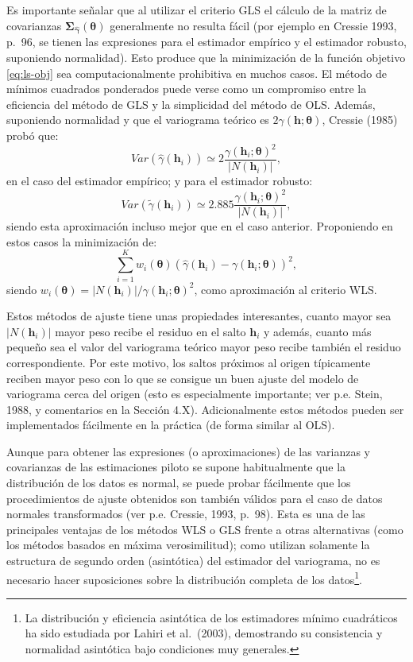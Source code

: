 \documentclass[
  spanish,
]{book}
\theoremstyle{break}
\theoremstyle{definition}
\theoremstyle{definition}
\theoremstyle{definition}
\theoremstyle{definition}
\theoremstyle{remark}
\begin{document}
Es importante señalar que al utilizar el criterio GLS el cálculo de la matriz de covarianzas \(\boldsymbol{\Sigma}_{\hat{\boldsymbol{\gamma}}} (\boldsymbol{\theta})\) generalmente no resulta fácil (por ejemplo en Cressie 1993, p.~96, se tienen las expresiones para el estimador empírico y el estimador robusto, suponiendo normalidad).
Esto produce que la minimización de la función objetivo \eqref{eq:ls-obj} sea computacionalmente prohibitiva en muchos casos.
El método de mínimos cuadrados ponderados puede verse como un compromiso entre la eficiencia del método de GLS y la simplicidad del método de OLS.
Además, suponiendo normalidad y que el variograma teórico es \(2\gamma(\mathbf{h};\boldsymbol{\theta})\), Cressie (1985) probó que:
\[Var(\hat{\gamma}(\mathbf{h}_{i}))\simeq 2\dfrac{\gamma(\mathbf{h}_{i}
;\boldsymbol{\theta})^2 }{\left| N(\mathbf{h}_{i})\right| },\]
en el caso del estimador empírico; y para el estimador robusto:
\[Var(\tilde{\gamma}(\mathbf{h}_{i}))\simeq 2.885\dfrac{\gamma
(\mathbf{h}_{i} ;\boldsymbol{\theta})^2 }{\left| N(\mathbf{h}_{i})\right| },\]
siendo esta aproximación incluso mejor que en el caso anterior.
Proponiendo en estos casos la minimización de:
\[\sum\limits_{i=1}^{K} w_{i}(\boldsymbol{\theta}) \left( \hat{\gamma}(\mathbf{h}_{i}) - \gamma(\mathbf{h}_{i};\boldsymbol{\theta}) \right)^2,\]
siendo \(w_{i}(\boldsymbol{\theta}) = \left| N(\mathbf{h}_{i})\right| /\gamma(\mathbf{h}_{i} ;\boldsymbol{\theta})^2\), como aproximación al criterio WLS.

Estos métodos de ajuste tiene unas propiedades interesantes, cuanto mayor sea \(\left| N(\mathbf{h}_{i})\right|\) mayor peso recibe el residuo en el salto \(\mathbf{h}_{i}\) y además, cuanto más pequeño sea el valor del variograma teórico mayor peso recibe también el residuo correspondiente.
Por este motivo, los saltos próximos al origen típicamente reciben mayor peso con lo que se consigue un buen ajuste del modelo de variograma cerca del origen (esto es especialmente importante; ver p.e. Stein, 1988, y comentarios en la Sección 4.X).
Adicionalmente estos métodos pueden ser implementados fácilmente en la práctica (de forma similar al OLS).

Aunque para obtener las expresiones (o aproximaciones) de las varianzas y covarianzas de las estimaciones piloto se supone habitualmente que la distribución de los datos es normal, se puede probar fácilmente que los procedimientos de ajuste obtenidos son también válidos para el caso de datos normales transformados (ver p.e. Cressie, 1993, p.~98).
Esta es una de las principales ventajas de los métodos WLS o GLS frente a otras alternativas (como los métodos basados en máxima verosimilitud); como utilizan solamente la estructura de segundo orden (asintótica) del estimador del variograma, no es necesario hacer suposiciones sobre la distribución completa de los datos\footnote{La distribución y eficiencia asintótica de los estimadores mínimo cuadráticos ha sido estudiada por Lahiri et al.~(2003), demostrando su consistencia y normalidad asintótica bajo condiciones muy generales.}.
\end{document}

